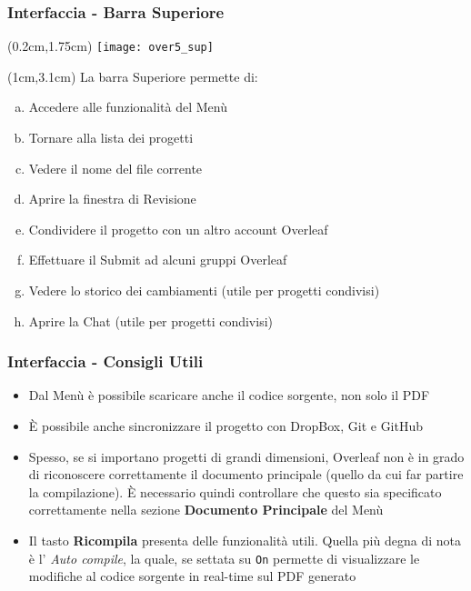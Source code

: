 \begin{frame}

  \frametitle{Interfaccia - Barra Superiore}
  
  \begin{textblock*}{20cm}(0.2cm,1.75cm)
    \texttt{[image: over5\_sup]}
  \end{textblock*}

  \begin{textblock*}{20cm}(1cm,3.1cm)
    La barra Superiore permette di:\newline
    \begin{enumerate}[a)]
       \item Accedere alle funzionalità del Menù
       \item Tornare alla lista dei progetti
       \item Vedere il nome del file corrente
       \item Aprire la finestra di Revisione
       \item Condividere il progetto con un altro account Overleaf
       \item Effettuare il Submit ad alcuni gruppi Overleaf
       \item Vedere lo storico dei cambiamenti (utile per progetti condivisi)
       \item Aprire la Chat (utile per progetti condivisi)
    \end{enumerate}
    \end{textblock*}

\end{frame}

\begin{frame}

  \frametitle{Interfaccia - Consigli Utili}

    \begin{itemize}
       \item Dal Menù è possibile scaricare anche il codice sorgente, non solo il PDF
       \item È possibile anche sincronizzare il progetto con DropBox, Git e GitHub
       \item Spesso, se si importano progetti di grandi dimensioni, Overleaf non è in grado
       di riconoscere correttamente il documento principale (quello da cui far partire la compilazione).
       È necessario quindi controllare che questo sia specificato correttamente nella sezione \textbf{Documento
       Principale} del Menù
       \item Il tasto \textbf{Ricompila} presenta delle funzionalità utili. Quella più degna di nota è l'
       \textit{Auto compile}, la quale, se settata su \texttt{On} permette di visualizzare le modifiche al
       codice sorgente in real-time sul PDF generato
    \end{itemize}

\end{frame}





